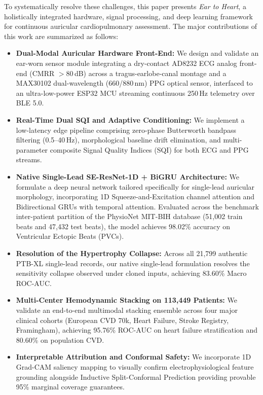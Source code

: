 To systematically resolve these challenges, this paper presents \textit{Ear to Heart}, a holistically integrated hardware, signal processing, and deep learning framework for continuous auricular cardiopulmonary assessment. The major contributions of this work are summarized as follows:
\begin{itemize}
    \item \textbf{Dual-Modal Auricular Hardware Front-End:} We design and validate an ear-worn sensor module integrating a dry-contact AD8232 ECG analog front-end (CMRR $> 80$\,dB) across a tragus-earlobe-canal montage and a MAX30102 dual-wavelength (660/880\,nm) PPG optical sensor, interfaced to an ultra-low-power ESP32 MCU streaming continuous 250\,Hz telemetry over BLE 5.0.
    \item \textbf{Real-Time Dual SQI and Adaptive Conditioning:} We implement a low-latency edge pipeline comprising zero-phase Butterworth bandpass filtering (0.5--40\,Hz), morphological baseline drift elimination, and multi-parameter composite Signal Quality Indices (SQI) for both ECG and PPG streams.
    \item \textbf{Native Single-Lead SE-ResNet-1D + BiGRU Architecture:} We formulate a deep neural network tailored specifically for single-lead auricular morphology, incorporating 1D Squeeze-and-Excitation channel attention and Bidirectional GRUs with temporal attention. Evaluated across the benchmark inter-patient partition of the PhysioNet MIT-BIH database (51,002 train beats and 47,432 test beats), the model achieves 98.02\% accuracy on Ventricular Ectopic Beats (PVCs).
    \item \textbf{Resolution of the Hypertrophy Collapse:} Across all 21,799 authentic PTB-XL single-lead records, our native single-lead formulation resolves the sensitivity collapse observed under cloned inputs, achieving 83.60\% Macro ROC-AUC.
    \item \textbf{Multi-Center Hemodynamic Stacking on 113,449 Patients:} We validate an end-to-end multimodal stacking ensemble across four major clinical cohorts (European CVD 70k, Heart Failure, Stroke Registry, Framingham), achieving 95.76\% ROC-AUC on heart failure stratification and 80.60\% on population CVD.
    \item \textbf{Interpretable Attribution and Conformal Safety:} We incorporate 1D Grad-CAM saliency mapping to visually confirm electrophysiological feature grounding alongside Inductive Split-Conformal Prediction providing provable 95\% marginal coverage guarantees.
\end{itemize}
